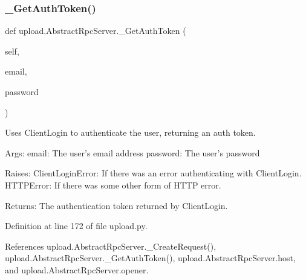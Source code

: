 \mbox{\label{classupload_1_1AbstractRpcServer_a5a801cc3fdbb8222fa58d41e098f70a7}} 
\subsubsection{\texorpdfstring{\+\_\+\+Get\+Auth\+Token()}{\_GetAuthToken()}\hspace{0.1cm}{\footnotesize\ttfamily [1/2]}}
{\footnotesize\ttfamily def upload.\+Abstract\+Rpc\+Server.\+\_\+\+Get\+Auth\+Token (\begin{DoxyParamCaption}\item[{}]{self,  }\item[{}]{email,  }\item[{}]{password }\end{DoxyParamCaption})\hspace{0.3cm}{\ttfamily [private]}}

\begin{DoxyVerb}Uses ClientLogin to authenticate the user, returning an auth token.

Args:
  email:    The user's email address
  password: The user's password

Raises:
  ClientLoginError: If there was an error authenticating with ClientLogin.
  HTTPError: If there was some other form of HTTP error.

Returns:
  The authentication token returned by ClientLogin.
\end{DoxyVerb}
 

Definition at line 172 of file upload.\+py.



References upload.\+Abstract\+Rpc\+Server.\+\_\+\+Create\+Request(), upload.\+Abstract\+Rpc\+Server.\+\_\+\+Get\+Auth\+Token(), upload.\+Abstract\+Rpc\+Server.\+host, and upload.\+Abstract\+Rpc\+Server.\+opener.


